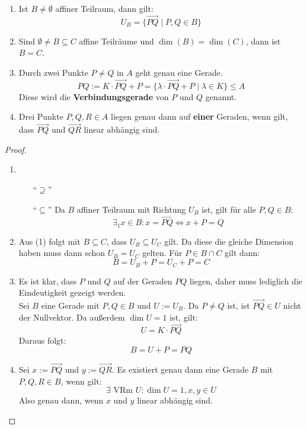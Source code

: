 \documentclass[parskip,a4paper,twoside,DIV15,BCOR12mm]{scrbook}
\begin{document}
\begin{lemma}
\begin{enumerate}
\item Ist $B\ne \emptyset$ affiner Teilraum, dann gilt:
\[U_B=\{\overrightarrow{PQ}\mid P,Q\in B\}\]
\item Sind $\emptyset\ne B \subseteq C$ affine Teilräume und $\dim(B)=\dim(C)$, dann ist $B=C$.
\item Durch zwei Punkte $P\ne Q$ in $A$ geht genau eine Gerade.
\[PQ := K \cdot \overrightarrow{PQ}+P = \{\lambda \cdot \overrightarrow{PQ}+P\mid\lambda\in K\}\le A\]
Diese wird die \textbf{Verbindungsgerade} von $P$ und $Q$ genannt.
\item Drei Punkte $P,Q,R \in A$ liegen genau dann auf \textbf{einer} Geraden, wenn gilt,
dass $\overrightarrow{PQ}$ und $\overrightarrow{QR}$ linear abhängig sind.
\end{enumerate}
\end{lemma}

\begin{proof}
\begin{enumerate}
\item 
\begin{enumerate}
\item["`$\supseteq$"']\checkmark
\item["`$\subseteq$"'] Da $B$ affiner Teilraum mit Richtung $U_B$ ist, gilt für alle $P,Q\in B$:
\[\exists_1 x\in B: x=\overrightarrow{PQ} \iff x+P = Q\]
\end{enumerate}
\item Aus (1) folgt mit $B\subseteq C$, dass $U_B\subseteq U_C$ gilt. Da diese die
gleiche Dimension haben muss dann schon $U_B=U_C$ gelten. Für $P\in B\cap C$ gilt dann:
\[B=U_B+P=U_C+P=C\]
\item Es ist klar, dass $P$ und $Q$ auf der Geraden $PQ$ liegen, daher muss lediglich die
Eindeutigkeit gezeigt werden.\\
Sei $B$ eine Gerade mit $P,Q\in B$ und $U:=U_B$. Da $P\ne Q$ ist, 
ist $\overrightarrow{PQ}\in U$ nicht der Nullvektor. Da außerdem $\dim U=1$ ist, gilt:
\[U=K\cdot\overrightarrow{PQ}\]
Daraus folgt:
\[B=U+P=PQ\]
\item Sei $x:=\overrightarrow{PQ}$ und $y:=\overrightarrow{QR}$. Es existiert genau dann
eine Gerade $B$ mit $P,Q,R\in B$, wenn gilt:
\[\exists\text{ VRm }U: \dim U=1, x,y\in U\]
Also genau dann, wenn $x$ und $y$ linear abhängig sind.
\end{enumerate}
\end{proof}
\end{document}
